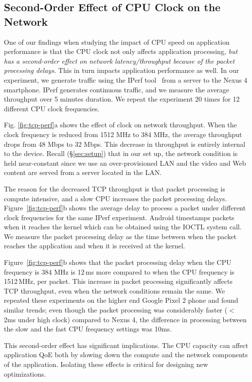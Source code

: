 \subsection{Second-Order Effect of CPU Clock on the Network} \label{label:throughput}

One of our findings when studying the impact of CPU speed on application performance is that 
the CPU clock not only affects application processing, {\em but has a second-order effect on network 
latency/throughput because of the packet processing delays.} This in turn impacts
application performance as well. In our experiment, we generate traffic using the IPerf tool~\cite{iperf-2015} from a server to the Nexus 4 smartphone. IPerf generates continuous traffic, and we measure the average throughput over 5 minutes duration. We repeat the experiment 20 times for 12 different CPU clock frequencies. 

Fig. \ref{fig:tcp-perf}a shows the effect of clock on network throughput. When the clock frequency is reduced from 1512 MHz to 384 MHz, the average throughput drops from 48 Mbps to 32 Mbps. This decrease in throughput is entirely internal to the device. Recall (\S\ref{sec:setup}) that in our set up, the network condition is held near-constant since we use an over-provisioned LAN and the video and Web content are served from a server located in the LAN. 

The reason for the decreased TCP throughput is that packet processing is compute intensive, and a slow CPU increases the packet processing delays. Figure~\ref{fig:tcp-perf}b shows the average delay to process a packet under different clock frequencies for the same IPerf experiment. Android timestamps packets when it reaches the kernel which can be obtained using the IOCTL system call. We measure the packet processing delay as the time between when the packet reaches the application and when it is received at the kernel.

Figure~\ref{fig:tcp-perf}b shows that the packet processing delay when the CPU frequency is 384 MHz is 
12\,ms more compared to when the CPU frequency is 1512\,MHz, per packet. This increase in packet processing significantly affects TCP throughput, even when the network conditions remain the same. We repeated these experiments on the higher end Google Pixel 2 phone and found similar trends; even though the packet processing was considerably faster ($<$ 2ms under high clock) compared to Nexus 4, the difference in processing between the slow and the fast CPU frequency settings was 10ms.  

This second-order effect has significant implications.  The CPU capacity can affect application QoE both by slowing down the compute and the network components of the application. Isolating these effects is critical for designing new optimizations.

